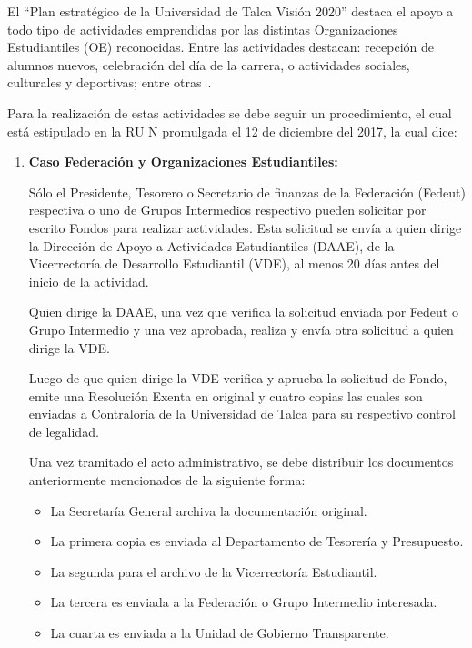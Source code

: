 El ``Plan estratégico de la Universidad de Talca Visión 2020'' destaca el apoyo a todo tipo de actividades emprendidas por las distintas Organizaciones Estudiantiles (OE) reconocidas. Entre las actividades destacan: recepción de alumnos nuevos, celebración del día de la carrera, o actividades sociales, culturales y deportivas; entre otras~\cite{5}.

Para la realización de estas actividades se debe seguir un procedimiento, el cual está estipulado en la RU N promulgada el 12 de diciembre del 2017, la cual dice:

\begin{enumerate}[label=\textbf{\Alph*.}]
    \item \textbf{Caso Federación y Organizaciones Estudiantiles:}

    Sólo el Presidente, Tesorero o Secretario de finanzas de la Federación (Fedeut) respectiva o uno de Grupos Intermedios respectivo pueden solicitar por escrito Fondos para realizar actividades. Esta solicitud se envía a quien dirige la Dirección de Apoyo a Actividades Estudiantiles (DAAE), de la Vicerrectoría de Desarrollo Estudiantil (VDE), al menos 20 días antes del inicio de la actividad. 

    Quien dirige la DAAE, una vez que verifica la solicitud enviada por Fedeut o Grupo Intermedio y una vez aprobada, realiza y envía otra solicitud a quien dirige la VDE.

    Luego de que quien dirige la VDE verifica y aprueba la solicitud de Fondo, emite una Resolución Exenta en original y cuatro copias las cuales son enviadas a Contraloría de la Universidad de Talca para su respectivo control de legalidad. 
    
    Una vez tramitado el acto administrativo, se debe distribuir los documentos anteriormente mencionados de la siguiente forma: 

    \begin{itemize}
        \item La Secretaría General archiva la documentación original.
        \item La primera copia es enviada al Departamento de Tesorería y Presupuesto.
        \item La segunda para el archivo de la Vicerrectoría Estudiantil.
        \item La tercera es enviada a la Federación o Grupo Intermedio interesada.
        \item La cuarta es enviada a la Unidad de Gobierno Transparente.
    \end{itemize}


\end{enumerate}
